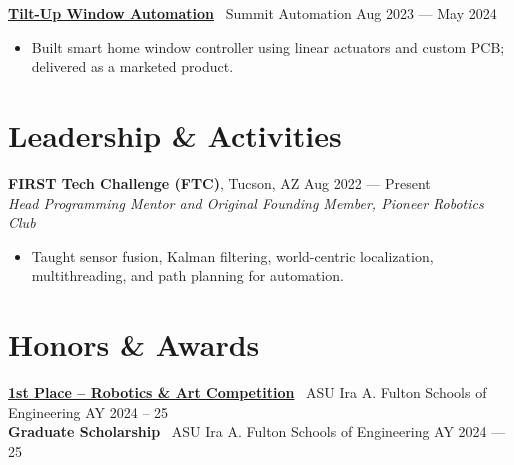 \documentclass[10pt]{article}
\begin{document}
\textbf{\href{https://www.youtube.com/watch?v=i5I38tLkD6o}{Tilt-Up Window Automation}} \textbar\ Summit Automation \hfill Aug 2023 --- May 2024
\begin{itemize}
  \item Built smart home window controller using linear actuators and custom PCB; delivered as a marketed product.
\end{itemize}

\section*{Leadership \& Activities}
\textbf{FIRST Tech Challenge (FTC)}, Tucson, AZ \hfill Aug 2022 --- Present \\
\textit{Head Programming Mentor and Original Founding Member, Pioneer Robotics Club}
\begin{itemize}
  \item Taught sensor fusion, Kalman filtering, world-centric localization, multithreading, and path planning for automation.
\end{itemize}

\section*{Honors \& Awards}
\textbf{\href{https://www.linkedin.com/posts/mhgross_asuengineering-design-robotics-activity-7324315472491855873-Gn_C}{1st Place -- Robotics \& Art Competition}} \textbar\ ASU Ira A. Fulton Schools of Engineering \hfill AY 2024 -- 25 \\
\textbf{Graduate Scholarship} \textbar\ ASU Ira A. Fulton Schools of Engineering \hfill AY 2024 --- 25
\end{document}
